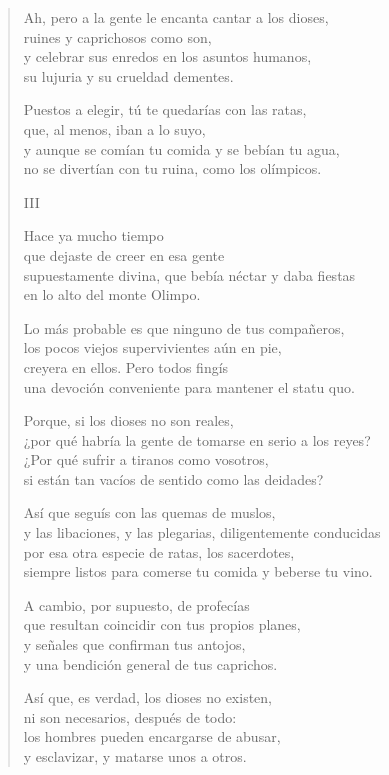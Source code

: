 \documentclass[11pt,a4paper]{article}
\begin{document}
\begin{verse}
Ah, pero a la gente le encanta cantar a los dioses,\\
ruines y caprichosos como son,\\
y celebrar sus enredos en los asuntos humanos,\\
su lujuria y su crueldad dementes.

Puestos a elegir, tú te quedarías con las ratas,\\
que, al menos, iban a lo suyo,\\
y aunque se comían tu comida y se bebían tu agua,\\
no se divertían con tu ruina, como los olímpicos.

III

Hace ya mucho tiempo\\
que dejaste de creer en esa gente\\
supuestamente divina, que bebía néctar y daba fiestas\\
en lo alto del monte Olimpo.

Lo más probable es que ninguno de tus compañeros,\\
los pocos viejos supervivientes aún en pie,\\
creyera en ellos. Pero todos fingís\\
una devoción conveniente para mantener el statu quo.

Porque, si los dioses no son reales,\\
¿por qué habría la gente de tomarse en serio a los reyes?\\
¿Por qué sufrir a tiranos como vosotros,\\
si están tan vacíos de sentido como las deidades?

Así que seguís con las quemas de muslos,\\
y las libaciones, y las plegarias, diligentemente conducidas\\
por esa otra especie de ratas, los sacerdotes,\\
siempre listos para comerse tu comida y beberse tu vino.

A cambio, por supuesto, de profecías\\
que resultan coincidir con tus propios planes,\\
y señales que confirman tus antojos,\\
y una bendición general de tus caprichos.

Así que, es verdad, los dioses no existen,\\
ni son necesarios, después de todo:\\
los hombres pueden encargarse de abusar,\\
y esclavizar, y matarse unos a otros.


\end{verse}
\end{document}
